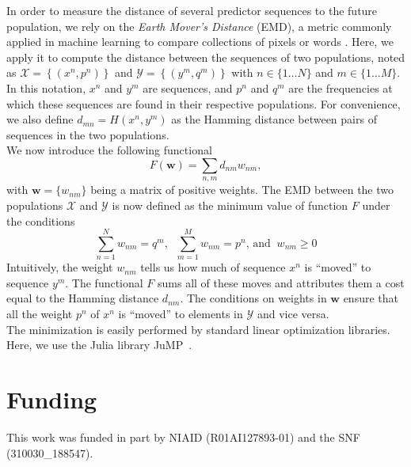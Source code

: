 \documentclass[reprint,amsmath,amssymb,superscriptaddress,showpacs,rmp]{revtex4-1}
\begin{document}
	In order to measure the distance of several predictor sequences to the future population, we rely on the \emph{Earth Mover's Distance} (EMD), a metric commonly applied in machine learning to compare collections of pixels or words \cite{710701,10.5555/3045118.3045221}. Here, we apply it to compute the distance between the sequences of two populations, noted as $\mathcal{X} = \left\{(x^n, p^n)\right\}$ and $\mathcal{Y}=\left\{(y^m,q^m)\right\}$ with $n\in\{1\ldots N\}$ and $m\in\{1\ldots M\}$. In this notation, $x^n$ and $y^m$ are sequences, and $p^n$ and $q^m$ are the frequencies at which these sequences are found in their respective populations. For convenience, we also define $d_{mn} = H(x^n,y^m)$ as the Hamming distance between pairs of sequences in the two populations. \\
	We now introduce the following functional
	$$ F(\mathbf{w}) = \sum_{n,m} d_{nm}w_{nm}, $$
	with $\mathbf{w} = \{w_{nm}\}$ being a matrix of positive weights. The EMD between the two populations $\mathcal{X}$ and $\mathcal{Y}$ is now defined as the minimum value of function $F$ under the conditions 
	\begin{equation*}
			\sum_{n=1}^N w_{nm} = q^m,\;\; \sum_{m=1}^M w_{nm} = p^n, \,\text{and}\;\; w_{nm}\geq 0
	\end{equation*}
	Intuitively, the weight $w_{nm}$ tells us how much of sequence $x^n$ is ``moved'' to sequence $y^m$. The functional $F$ sums all of these moves and attributes them a cost equal to the Hamming distance $d_{nm}$. The conditions on weights in $\mathbf{w}$ ensure that all the weight $p^n$ of $x^n$ is ``moved'' to elements in $\mathcal{Y}$ and vice versa. \\
	The minimization is easily performed by standard linear optimization libraries. Here, we use the Julia library {JuMP}~\cite{DunningHuchetteLubin2017}.


\section{Funding}
This work was funded in part by NIAID (R01AI127893-01) and the SNF (310030\_188547).




\newpage 
\appendix
\setcounter{figure}{0}
\renewcommand{\figurename}{Figure S}
\setcounter{table}{0}
\renewcommand{\tablename}{Table S}
\onecolumngrid
\end{document}
